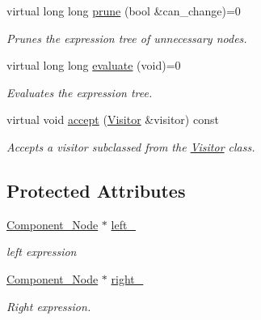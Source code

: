 \begin{DoxyCompactItemize}
virtual long long \hyperlink{classMadara_1_1Expression__Tree_1_1Component__Node_a8833adfc3e79980a90e82a68586f4300}{prune} (bool \&can\_\-change)=0
\begin{DoxyCompactList}\small\item\em Prunes the expression tree of unnecessary nodes. \item\end{DoxyCompactList}\item 
virtual long long \hyperlink{classMadara_1_1Expression__Tree_1_1Component__Node_a16c08750339b84c363e9fd0ea9858969}{evaluate} (void)=0
\begin{DoxyCompactList}\small\item\em Evaluates the expression tree. \item\end{DoxyCompactList}\item 
virtual void \hyperlink{classMadara_1_1Expression__Tree_1_1Component__Node_ac3bb92d96b29f14ee23289c73a2307d1}{accept} (\hyperlink{classMadara_1_1Expression__Tree_1_1Visitor}{Visitor} \&visitor) const 
\begin{DoxyCompactList}\small\item\em Accepts a visitor subclassed from the \hyperlink{classMadara_1_1Expression__Tree_1_1Visitor}{Visitor} class. \item\end{DoxyCompactList}\end{DoxyCompactItemize}
\subsection*{Protected Attributes}
\begin{DoxyCompactItemize}
\item 
\hyperlink{classMadara_1_1Expression__Tree_1_1Component__Node}{Component\_\-Node} $\ast$ \hyperlink{classMadara_1_1Expression__Tree_1_1Composite__Binary__Node_acac60a70beb2484737e6e7161edb2d1b}{left\_\-}
\begin{DoxyCompactList}\small\item\em left expression \item\end{DoxyCompactList}\item 
\hyperlink{classMadara_1_1Expression__Tree_1_1Component__Node}{Component\_\-Node} $\ast$ \hyperlink{classMadara_1_1Expression__Tree_1_1Composite__Unary__Node_a077b7bd1b52df6f5c6adfde735556a68}{right\_\-}
\begin{DoxyCompactList}\small\item\em Right expression. \item\end{DoxyCompactList}\end{DoxyCompactItemize}


